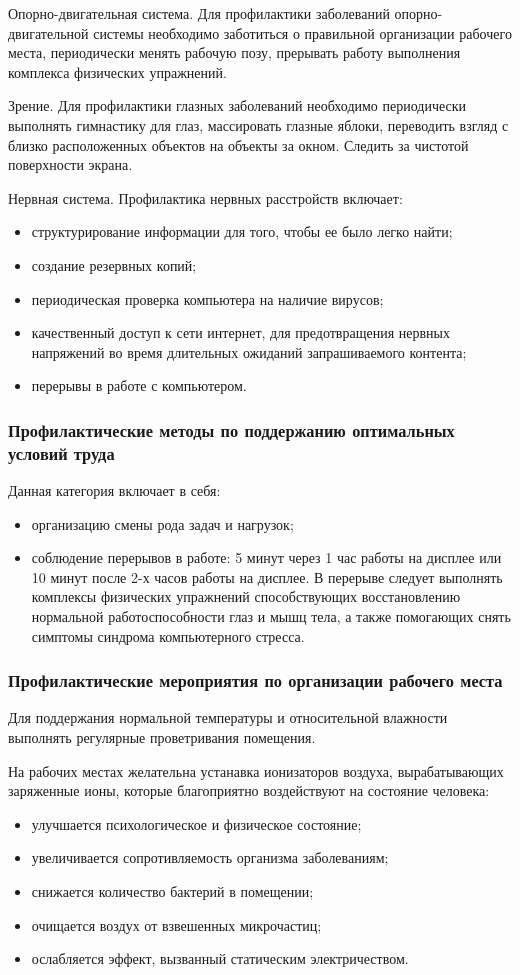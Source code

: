 Опорно-двигательная система. Для профилактики заболеваний опорно-двигательной системы необходимо заботиться о правильной организации рабочего места, периодически менять рабочую позу, прерывать работу выполнения комплекса физических упражнений.

Зрение. Для профилактики глазных заболеваний необходимо периодически выполнять гимнастику для глаз, массировать глазные яблоки, переводить взгляд с близко расположенных объектов на объекты за окном. Следить за чистотой поверхности экрана.

Нервная система. Профилактика нервных расстройств включает:
\begin{itemize}
\item структурирование информации для того, чтобы ее было легко найти;
\item создание резервных копий;
\item периодическая проверка компьютера на наличие вирусов;
\item качественный доступ к сети интернет,  для предотвращения нервных напряжений во время длительных ожиданий запрашиваемого контента;
\item перерывы в работе с компьютером.
\end{itemize}

\subsubsection{Профилактические методы по поддержанию оптимальных условий труда}
Данная категория включает в себя:
\begin{itemize}
\item организацию смены рода задач и нагрузок;
\item соблюдение  перерывов в работе: 5 минут через 1 час работы на дисплее или 10 минут после 2-х часов работы на дисплее. В перерыве следует выполнять комплексы физических упражнений способствующих восстановлению нормальной работоспособности глаз и мышц тела, а также помогающих снять симптомы синдрома компьютерного стресса.
\end{itemize}

\subsubsection{Профилактические мероприятия по организации рабочего места}
Для поддержания нормальной температуры и относительной влажности выполнять регулярные проветривания помещения.

На рабочих местах желательна устанавка ионизаторов воздуха, вырабатывающих заряженные ионы, которые благоприятно воздействуют на состояние человека:
\begin{itemize}
\item улучшается психологическое и физическое состояние;
\item увеличивается сопротивляемость организма заболеваниям;
\item снижается количество бактерий в помещении;
\item очищается воздух от взвешенных микрочастиц;
\item ослабляется эффект, вызванный статическим электричеством.
\end{itemize}

